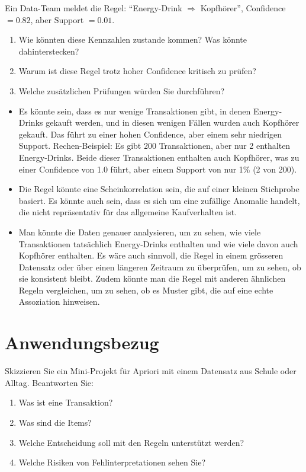 \begin{myexercise}
    Ein Data-Team meldet die Regel:
    \enquote{Energy-Drink $\Rightarrow$ Kopfhörer},
    Confidence $= 0.82$, aber Support $= 0.01$.
    \begin{enumerate}
        \item Wie könnten diese Kennzahlen zustande kommen? Was könnte dahinterstecken?
        \item Warum ist diese Regel trotz hoher Confidence kritisch zu prüfen?
        \item Welche zusätzlichen Prüfungen würden Sie durchführen?
    \end{enumerate}
    \begin{myanswer}
        \begin{itemize}
            \item Es könnte sein, dass es nur wenige Transaktionen gibt, in denen Energy-Drinks gekauft werden, und in diesen wenigen Fällen wurden auch Kopfhörer gekauft. Das führt zu einer hohen Confidence, aber einem sehr niedrigen Support. Rechen-Beispiel: Es gibt 200 Transaktionen, aber nur 2 enthalten Energy-Drinks. Beide dieser Transaktionen enthalten auch Kopfhörer, was zu einer Confidence von 1.0 führt, aber einem Support von nur 1\% (2 von 200).
            \item Die Regel könnte eine Scheinkorrelation sein, die auf einer kleinen Stichprobe basiert. Es könnte auch sein, dass es sich um eine zufällige Anomalie handelt, die nicht repräsentativ für das allgemeine Kaufverhalten ist.
            \item Man könnte die Daten genauer analysieren, um zu sehen, wie viele Transaktionen tatsächlich Energy-Drinks enthalten und wie viele davon auch Kopfhörer enthalten. Es wäre auch sinnvoll, die Regel in einem grösseren Datensatz oder über einen längeren Zeitraum zu überprüfen, um zu sehen, ob sie konsistent bleibt. Zudem könnte man die Regel mit anderen ähnlichen Regeln vergleichen, um zu sehen, ob es Muster gibt, die auf eine echte Assoziation hinweisen.
        \end{itemize}
    \end{myanswer}
\end{myexercise}

\section{Anwendungsbezug}

\begin{mychallenge}
    Skizzieren Sie ein Mini-Projekt für Apriori mit einem Datensatz aus Schule oder Alltag.
    Beantworten Sie:
    \begin{enumerate}
        \item Was ist eine Transaktion?
        \item Was sind die Items?
        \item Welche Entscheidung soll mit den Regeln unterstützt werden?
        \item Welche Risiken von Fehlinterpretationen sehen Sie?
    \end{enumerate}
\end{mychallenge}
